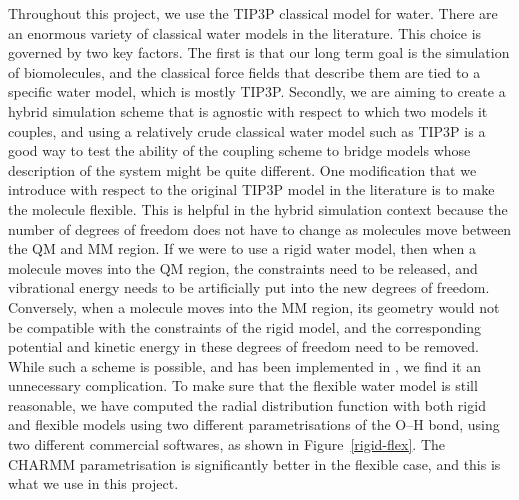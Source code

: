 \documentclass[11pt]{revtex4}
\begin{document}
Throughout this project, we use the TIP3P classical model for water. There are an enormous variety of classical water models in the literature. This choice is governed by two key factors. The first is that our long term goal is the simulation of biomolecules, and the classical force fields that describe them are tied to a specific water model, which is mostly TIP3P. Secondly, we are aiming to create a hybrid simulation scheme that is agnostic with respect to which two models it couples, and using a relatively crude classical water model such as TIP3P is a good way to test the ability of the coupling scheme to bridge models whose description of the system might be quite different. One modification that we introduce with respect to the original TIP3P model in the literature is to make the molecule flexible. This is helpful in the hybrid simulation context because the number of degrees of freedom does not have to change as molecules move between the QM and MM region. If we were to use a rigid water model, then when a molecule moves into the QM region, the constraints need to be released, and vibrational energy needs to be artificially put into the new degrees of freedom. Conversely, when a molecule moves into the MM region, its geometry would not be compatible with the constraints of the rigid model, and the corresponding potential and kinetic energy in these degrees of freedom need to be removed. While such a scheme is possible, and has been implemented in \cite{hodak_j_chem_phys_2008a,winfield_thesis_2009a}, we find it an unnecessary complication. To make sure that the flexible water model is still reasonable, we have computed the radial distribution function with both rigid and flexible models using two different parametrisations of the O--H bond, using two different commercial softwares, as shown in Figure~\ref{rigid-flex}. The CHARMM parametrisation is significantly better in the flexible case, and this is what we use in this project.
\end{document}
